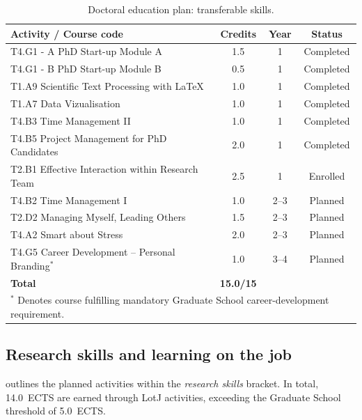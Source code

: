 \begin{table}[!ht]
    \centering
    \caption{Doctoral education plan: transferable skills.}
    \label{tab:transferable-skills}
    \small
    \begin{tabularx}{\textwidth}{Xccc}
        \toprule
        \textbf{Activity / Course code} & \textbf{Credits} & \textbf{Year} & \textbf{Status} \\
        \midrule
        T4.G1 - A \textbar{} PhD Start-up Module A & 1.5 & 1 & Completed \\
        T4.G1 - B \textbar{} PhD Start-up Module B & 0.5 & 1 & Completed \\
        T1.A9 \textbar{} Scientific Text Processing with \LaTeX & 1.0 & 1 & Completed \\
        T1.A7 \textbar{} Data Vizualisation & 1.0 & 1 & Completed \\
        T4.B3 \textbar{} Time Management II & 1.0 & 1 & Completed \\
        T4.B5 \textbar{} Project Management for PhD Candidates & 2.0 & 1 & Completed \\
        T2.B1 \textbar{} Effective Interaction within Research Team & 2.5 & 1 & Enrolled \\
        T4.B2 \textbar{} Time Management I & 1.0 & 2--3 & Planned \\
        T2.D2 \textbar{} Managing Myself, Leading Others & 1.5 & 2--3 & Planned \\
        T4.A2 \textbar{} Smart about Stress & 2.0 & 2--3 & Planned \\
        T4.G5 \textbar{} Career Development -- Personal Branding$^\ast$ & 1.0 & 3--4 & Planned \\
        \midrule
        \textbf{Total} & \textbf{15.0/15} & & \\
        \midrule
        \multicolumn{4}{l}{\footnotesize $^\ast$ Denotes course fulfilling mandatory Graduate School career-development requirement.} \\
        \bottomrule
    \end{tabularx}
\end{table}


\subsection{Research skills and learning on the job}
\label{sec:research-skills}

 outlines the planned activities within the \emph{research skills} bracket.
In total, \qty{14.0}{ECTS} are earned through LotJ activities, exceeding the Graduate School threshold of \qty{5.0}{ECTS}.

